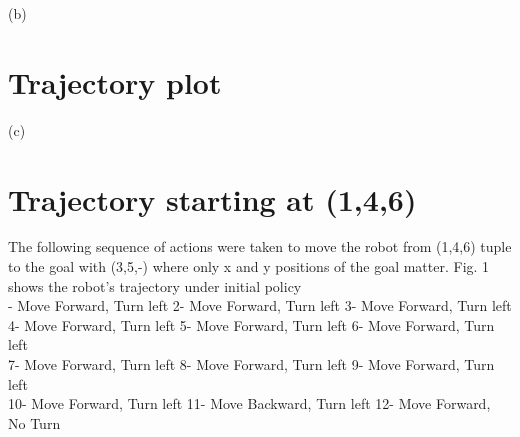 \documentclass{article}
\begin{document}
	\newpage
	(b)
	\section*{Trajectory plot}
	
	
	\newpage
	(c) 
	\section*{Trajectory starting at (1,4,6)}
	The following sequence of actions were taken to move the robot from (1,4,6) tuple to the goal with (3,5,-) where only x and y positions of the goal matter. Fig. 1 shows the robot's trajectory under initial policy \\
	
	- Move Forward, Turn left   \hspace{20pt}    2- Move Forward, Turn left \hspace{20pt}    3- Move Forward, Turn left \\ 
	4- Move Forward, Turn left   \hspace{20pt}    5- Move Forward, Turn left \hspace{20pt}    6- Move Forward, Turn left \\
	7- Move Forward, Turn left   \hspace{20pt}    8- Move Forward, Turn left \hspace{20pt}    9- Move Forward, Turn left \\
	10- Move Forward, Turn left   \hspace{20pt}    11- Move Backward, Turn left \hspace{20pt}    12- Move Forward, No Turn
	
\end{document}
